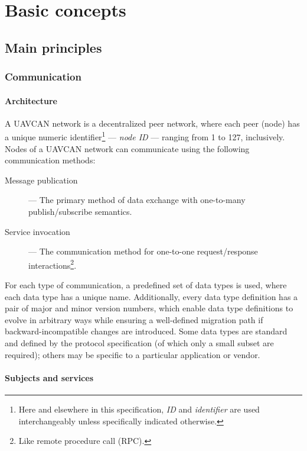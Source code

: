 \chapter{Basic concepts}\label{sec:basic_concepts}

\section{Main principles}

\subsection{Communication}

\subsubsection{Architecture}

A UAVCAN network is a decentralized peer network, where each peer (node) has a unique
numeric identifier\footnote{Here and elsewhere in this specification, \emph{ID} and \emph{identifier} are used
interchangeably unless specifically indicated otherwise.}
--- \emph{node ID} --- ranging from 1 to 127, inclusively.
Nodes of a UAVCAN network can communicate using the following communication methods:

\begin{description}
    \item[Message publication] --- The primary method of data exchange with one-to-many publish/subscribe semantics.
    \item[Service invocation] --- The communication method for one-to-one request/response
    interactions\footnote{Like remote procedure call (RPC).}.
\end{description}

For each type of communication, a predefined set of data types is used,
where each data type has a unique name.
Additionally, every data type definition has a pair of major and minor version numbers,
which enable data type definitions to evolve in arbitrary ways while ensuring a well-defined
migration path if backward-incompatible changes are introduced.
Some data types are standard and defined by the protocol specification (of which only a small
subset are required); others may be specific to a particular application or vendor.

\subsubsection{Subjects and services}

